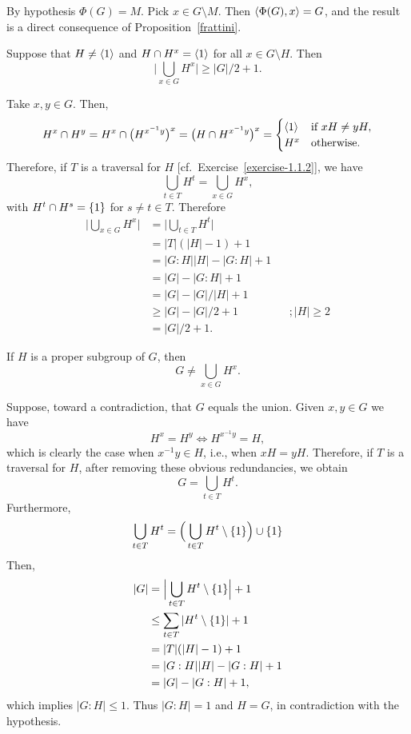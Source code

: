 \begin{solution}
    By hypothesis $\Phi(G)=M$. Pick $x\in G\setminus M$. Then $\langle\Phi(G),x\rangle=G$, and the result is a direct consequence of Proposition~\ref{frattini}.
\end{solution}

\begin{exr}\label{exercise-1.1.11}
    Suppose that\/ $H\neq\langle1\rangle$ and\/ $H\cap H^x=\langle1\rangle$ for all\/ $x\in G\setminus H$. Then
    $$
        \Big|\bigcup_{x\in G}H^x\Big| \ge |G|/2 + 1.
    $$
\end{exr}

\begin{solution} Take $x,y\in G$. Then,
$$
    H^x\cap H^y = H^x\cap\big(H^{x^{-1}y}\big)^x = \big(H\cap H^{x^{-1}y}\big)^x = \begin{cases}
        \langle1\rangle   &\text{if }xH\ne yH,\\
        H^x   &\text{otherwise}.
    \end{cases}
$$
Therefore, if $T$ is a traversal for $H$ [cf.~Exercise~\ref{exercise-1.1.2}], we have
$$
    \bigcup_{t\in T}H^t = \bigcup_{x\in G}H^x,
$$
with $H^t\cap H^s=\{1\}$ for $s\ne t\in T$. Therefore
\begin{align*}
     \Big|\bigcup_{x\in G}H^x\Big| &= \Big|\bigcup_{t\in T}H^t\Big|\\
        &= |T|(|H|-1)+1\\
        &= |G:H||H|-|G:H|+1\\
        &= |G|-|G:H|+1\\
        &= |G| - |G|/|H| + 1\\
        &\ge |G| - |G|/2 + 1    &&; |H|\ge2\\
        &= |G|/2 + 1.
\end{align*}
 \end{solution}

\begin{exr}\label{exercise-1.1.12}
    If\/ $H$ is a proper subgroup of\/ $G$, then
    $$
        G\ne\bigcup_{x\in G}H^x.
    $$
\end{exr}

\begin{solution} Suppose, toward a contradiction, that $G$ equals the union. Given $x,y\in G$ we have
$$
    H^x=H^y\iff H^{x^{-1}y}=H,
$$
which is clearly the case when $x^{-1}y\in H$, i.e., when $xH=yH$. Therefore, if $T$ is a traversal for $H$, after removing these obvious redundancies, we obtain
$$
    G = \bigcup_{t\in T}H^t.
$$
Furthermore,
$$
    \bigcup_{t\in T}H^t = \Big(\bigcup_{t\in T}H^t\setminus\{1\}\Big)\cup\{1\}
$$
Then,
\begin{align*}
    |G| &= \Big|\bigcup_{t\in T}H^t\setminus\{1\}\Big|+1\\
        &\le \sum_{t\in T}|H^t\setminus\{1\}|+1\\
        &= |T|(|H|-1) + 1\\
        &= |G:H||H|-|G:H| + 1\\
        &= |G| - |G:H| + 1,
\end{align*}
which implies $|G:H|\le1$. Thus $|G:H|=1$ and $H=G$, in contradiction with the hypothesis.  \end{solution}


